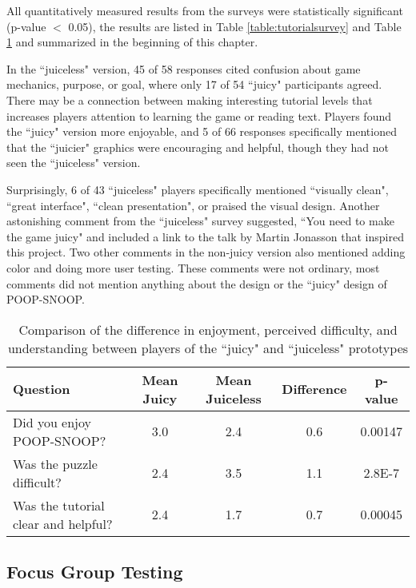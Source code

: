 All quantitatively measured results from the surveys were statistically significant (p-value $<$ 0.05), the results are listed in Table \ref{table:tutorialsurvey} and Table \ref{table:gamesurvey} and summarized in the beginning of this chapter.

In the ``juiceless" version, 45 of 58 responses cited confusion about game mechanics, purpose, or goal, where only 17 of 54 ``juicy" participants agreed. There may be a connection between making interesting tutorial levels that increases players attention to learning the game or reading text. Players found the ``juicy" version more enjoyable, and 5 of 66 responses specifically mentioned that the ``juicier" graphics were encouraging and helpful, though they had not seen the ``juiceless" version.

Surprisingly, 6 of 43 ``juiceless" players specifically mentioned ``visually clean", ``great interface", ``clean presentation", or praised the visual design. Another astonishing comment from the ``juiceless" survey suggested, ``You need to make the game juicy" and included a link to the talk by Martin Jonasson \cite{juiceitorloseit} that inspired this project. Two other comments in the non-juicy version also mentioned adding color and doing more user testing. These comments were not ordinary, most comments did not mention anything about the design or the ``juicy" design of POOP-SNOOP.

\begin{table}
\begin{center}

\begin{tabular}{|>{\centering}p{3cm}|c|c|c||c|}
\hline 
Question&  Mean Juicy&  Mean Juiceless&  Difference&  p-value
\tabularnewline
\hline 
Did you enjoy POOP-SNOOP?&  3.0&  2.4&  0.6&  0.00147
\tabularnewline
\hline 
Was the puzzle difficult?&  2.4&  3.5&  1.1&  2.8E-7
\tabularnewline
\hline 
Was the tutorial clear and helpful?&  2.4&  1.7&  0.7& 0.00045
\tabularnewline
\hline 
\end{tabular}

\caption{Comparison of the difference in enjoyment, perceived difficulty, and understanding between players of the ``juicy" and ``juiceless" prototypes}
\label{table:gamesurvey}
\end{center}
\end{table}

\subsection{Focus Group Testing}


